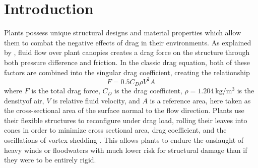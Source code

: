 \section{Introduction}


Plants possess unique structural designs and material properties which allow them to combat the negative effects of drag in their environments. As explained by \citet{delangre2008effects}, fluid flow over plant canopies creates a drag force on the structure through both pressure difference and friction. In the classic drag equation, both of these factors are combined into the singular drag coefficient, creating the relationship
\begin{equation}
F=0.5 C_D \rho V^2 A
\end{equation}
where $F$ is the total drag force, $C_D$ is the drag coefficient, $\rho=\SI{1.204}{\kilo\gram\per\meter\cubed}$ is the densityof air, $V$ is relative fluid velocity, and $A$ is a reference area, here taken as the cross-sectional area of the surface normal to the flow direction. Plants use their flexible structures to reconfigure under drag load, rolling their leaves into cones in order to minimize cross sectional area, drag coefficient, and the oscillations of vortex shedding \citep{vogel1989drag}. This allows plants to endure the onslaught of heavy winds or floodwaters with much lower risk for structural damage than if they were to be entirely rigid. 

